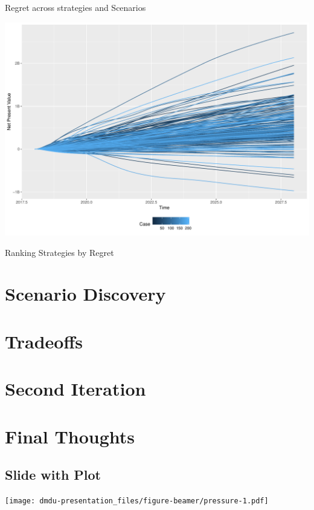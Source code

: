 \documentclass[ignorenonframetext,]{beamer}
\begin{document}
\begin{frame}{Regret across strategies and Scenarios}

\begin{center}\includegraphics{dmdu-presentation_files/figure-beamer/unnamed-chunk-12-1} \end{center}

\end{frame}

\begin{frame}{Ranking Strategies by Regret}

\end{frame}

\section{Scenario Discovery}\label{scenario-discovery}

\section{Tradeoffs}\label{tradeoffs}

\section{Second Iteration}\label{second-iteration}

\section{Final Thoughts}\label{final-thoughts}

\subsection{Slide with Plot}\label{slide-with-plot}

\texttt{[image: dmdu-presentation\_files/figure-beamer/pressure-1.pdf]}
\end{document}
